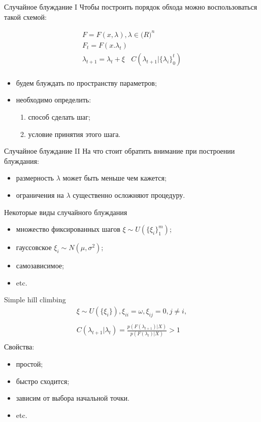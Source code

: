 \documentclass[14pt, fleqn, xcolor={dvipsnames, table}]{beamer}
\begin{document}
\begin{frame}{Случайное блуждание I}
Чтобы построить порядок обхода можно воспользоваться такой схемой:

$$\begin{array}{l}
F = F(x, \lambda), \lambda \in \mathcal(R)^n \\
F_t = F(x. \lambda_t) \\
\lambda_{t+1} = \lambda_t + \xi~~~~C(\lambda_{t+1} | \{\lambda_i\}_0^t) \\
\end{array}$$

\begin{itemize}
  \item будем блуждать по пространству параметров;
  \item необходимо определить:
  \begin{enumerate}
    \item способ сделать шаг;
    \item условие принятия этого шага.
  \end{enumerate}
\end{itemize}
\end{frame}

\begin{frame}{Случайное блуждание II}
На что стоит обратить внимание при построении блуждания:
\begin{itemize}
  \item размерность $\lambda$ может быть меньше чем кажется;
  \item ограничения на $\lambda$ существенно осложняют процедуру.
\end{itemize}
\end{frame}


\begin{frame}{Некоторые виды случайного блуждания}
\begin{itemize}
  \item множество фиксированных шагов $\xi \sim U(\{\xi_i\}_1^m)$;
  \item гауссовское $\xi_i \sim N(\mu, \sigma^2)$;
  \item самозависимое;
  \item etc.
\end{itemize}
\end{frame}

\begin{frame}{Simple hill climbing}
$$\begin{array}{l}
\xi \sim U(\{\xi_i\}), \xi_{ii} = \omega, \xi_{ij} = 0, j \neq i,\\
\\
C(\lambda_{t+1}|\lambda_t) = \frac{p(F(\lambda_{t+1})|X)}{p(F(\lambda_t)|X)} > 1 \\
\end{array}$$
Свойства:
\begin{itemize}
  \item простой;
  \item быстро сходится;
  \item зависим от выбора начальной точки.
  \item etc.
\end{itemize}
\end{frame}
\end{document}

